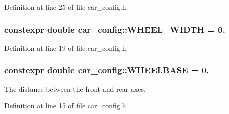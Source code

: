 Definition at line 25 of file car\+\_\+config.\+h.

\subsubsection[{\texorpdfstring{W\+H\+E\+E\+L\+\_\+\+W\+I\+D\+TH}{WHEEL_WIDTH}}]{\setlength{\rightskip}{0pt plus 5cm}constexpr double car\+\_\+config\+::\+W\+H\+E\+E\+L\+\_\+\+W\+I\+D\+TH = 0.}\hypertarget{namespacecar__config_ace29186cd9605cde6edd0fd9b814df63}{}\label{namespacecar__config_ace29186cd9605cde6edd0fd9b814df63}


Definition at line 19 of file car\+\_\+config.\+h.

\subsubsection[{\texorpdfstring{W\+H\+E\+E\+L\+B\+A\+SE}{WHEELBASE}}]{\setlength{\rightskip}{0pt plus 5cm}constexpr double car\+\_\+config\+::\+W\+H\+E\+E\+L\+B\+A\+SE = 0.}\hypertarget{namespacecar__config_a4e9e4925d43a88de91b13bedafabce67}{}\label{namespacecar__config_a4e9e4925d43a88de91b13bedafabce67}


The distance between the front and rear axes. 



Definition at line 15 of file car\+\_\+config.\+h.

